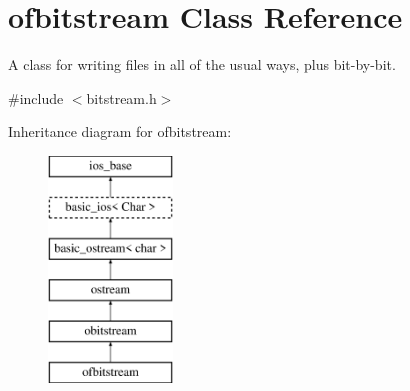 \hypertarget{classofbitstream}{}\section{ofbitstream Class Reference}
\label{classofbitstream}


A class for writing files in all of the usual ways, plus bit-\/by-\/bit.  




{\ttfamily \#include $<$bitstream.\+h$>$}

Inheritance diagram for ofbitstream\+:\begin{figure}[H]
\begin{center}
\leavevmode
\includegraphics[height=6.000000cm]{classofbitstream}
\end{center}
\end{figure}
